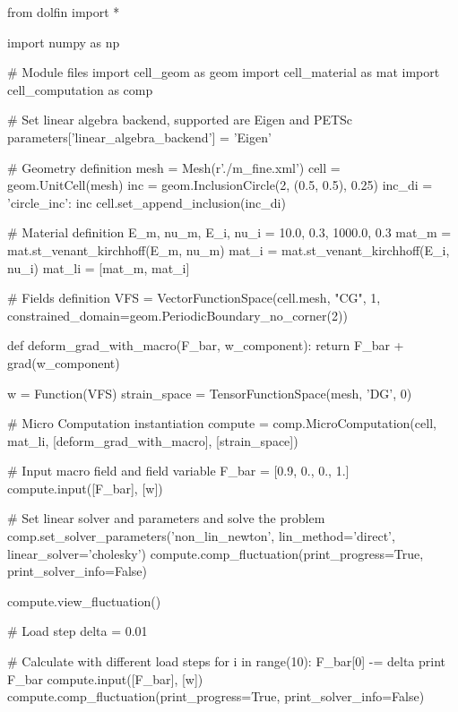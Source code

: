 \begin{python}
from dolfin import *

import numpy as np

# Module files
import cell_geom as geom
import cell_material as mat
import cell_computation as comp

# Set linear algebra backend, supported are Eigen and PETSc
parameters['linear_algebra_backend'] = 'Eigen'

# Geometry definition
mesh = Mesh(r'./m_fine.xml')
cell = geom.UnitCell(mesh)
inc = geom.InclusionCircle(2, (0.5, 0.5), 0.25)
inc_di = {'circle_inc': inc}
cell.set_append_inclusion(inc_di)

# Material definition
E_m, nu_m, E_i, nu_i = 10.0, 0.3, 1000.0, 0.3
mat_m = mat.st_venant_kirchhoff(E_m, nu_m)
mat_i = mat.st_venant_kirchhoff(E_i, nu_i)
mat_li = [mat_m, mat_i]

# Fields definition
VFS = VectorFunctionSpace(cell.mesh, "CG", 1, 
                          constrained_domain=geom.PeriodicBoundary_no_corner(2))

def deform_grad_with_macro(F_bar, w_component):
    return F_bar + grad(w_component)

w = Function(VFS)
strain_space = TensorFunctionSpace(mesh, 'DG', 0)

# Micro Computation instantiation
compute = comp.MicroComputation(cell, mat_li, 
                                [deform_grad_with_macro],
                                [strain_space])

# Input macro field and field variable
F_bar = [0.9, 0., 0., 1.]
compute.input([F_bar], [w])

# Set linear solver and parameters and solve the problem
comp.set_solver_parameters('non_lin_newton', lin_method='direct',
                      linear_solver='cholesky')
compute.comp_fluctuation(print_progress=True, print_solver_info=False)

compute.view_fluctuation()

# Load step
delta = 0.01

# Calculate with different load steps
for i in range(10):
    F_bar[0] -= delta
    print F_bar
    compute.input([F_bar], [w])
    compute.comp_fluctuation(print_progress=True, print_solver_info=False)
\end{python}

